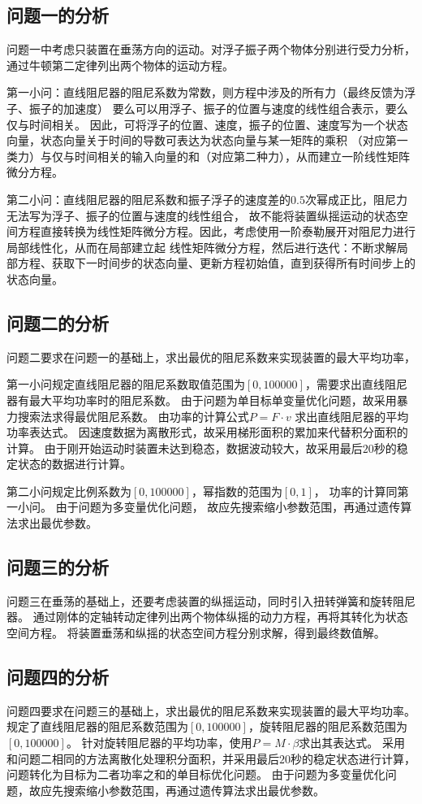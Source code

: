 \documentclass[withoutpreface,bwprint]{cumcmthesis} %
\begin{document}
    \subsection{问题一的分析}
    问题一中考虑只装置在垂荡方向的运动。对浮子振子两个物体分别进行受力分析，通过牛顿第二定律列出两个物体的运动方程。

    第一小问：直线阻尼器的阻尼系数为常数，则方程中涉及的所有力（最终反馈为浮子、振子的加速度）
    要么可以用浮子、振子的位置与速度的线性组合表示，要么仅与时间相关。
    因此，可将浮子的位置、速度，振子的位置、速度写为一个状态向量，状态向量关于时间的导数可表达为状态向量与某一矩阵的乘积
    （对应第一类力）与仅与时间相关的输入向量的和（对应第二种力），从而建立一阶线性矩阵微分方程。
    
    第二小问：直线阻尼器的阻尼系数和振子浮子的速度差的$0.5$次幂成正比，阻尼力无法写为浮子、振子的位置与速度的线性组合，
    故不能将装置纵摇运动的状态空间方程直接转换为线性矩阵微分方程。因此，考虑使用一阶泰勒展开对阻尼力进行局部线性化，从而在局部建立起
    线性矩阵微分方程，然后进行迭代：不断求解局部方程、获取下一时间步的状态向量、更新方程初始值，直到获得所有时间步上的状态向量。
    \subsection{问题二的分析}
    问题二要求在问题一的基础上，求出最优的阻尼系数来实现装置的最大平均功率，

    第一小问规定直线阻尼器的阻尼系数取值范围为$[0,100000]$，需要求出直线阻尼器有最大平均功率时的阻尼系数。
    由于问题为单目标单变量优化问题，故采用暴力搜索法求得最优阻尼系数。
    由功率的计算公式$P=F\cdot v$ 求出直线阻尼器的平均功率表达式。
    因速度数据为离散形式，故采用梯形面积的累加来代替积分面积的计算。
    由于刚开始运动时装置未达到稳态，数据波动较大，故采用最后$20$秒的稳定状态的数据进行计算。

    第二小问规定比例系数为$[0,100000]$，幂指数的范围为$[0,1]$，
    功率的计算同第一小问。
    由于问题为多变量优化问题，
    故应先搜索缩小参数范围，再通过遗传算法求出最优参数。

    \subsection{问题三的分析}
    问题三在垂荡的基础上，还要考虑装置的纵摇运动，同时引入扭转弹簧和旋转阻尼器。
    通过刚体的定轴转动定律列出两个物体纵摇的动力方程，再将其转化为状态空间方程。
    将装置垂荡和纵摇的状态空间方程分别求解，得到最终数值解。
    \subsection{问题四的分析}
    问题四要求在问题三的基础上，求出最优的阻尼系数来实现装置的最大平均功率。
    规定了直线阻尼器的阻尼系数范围为$[0,100000]$，旋转阻尼器的阻尼系数范围为$[0,100000]$。
    针对旋转阻尼器的平均功率，使用$P = M\cdot \beta$求出其表达式。
    采用和问题二相同的方法离散化处理积分面积，并采用最后$20$秒的稳定状态进行计算，
    问题转化为目标为二者功率之和的单目标优化问题。
    由于问题为多变量优化问题，故应先搜索缩小参数范围，再通过遗传算法求出最优参数。
\end{document}
